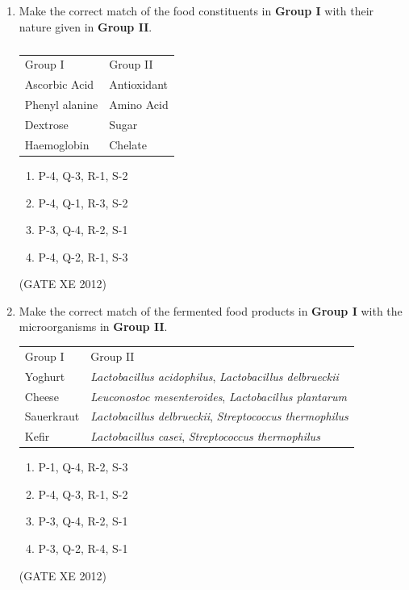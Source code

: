 \documentclass[12pt]{article}
\begin{document}
\begin{enumerate}
\item Make the correct match of the food constituents in \textbf{Group I} with their nature given in \textbf{Group II}.  

\begin{table}[H]
\centering
\caption{} \label{}
\begin{tabular}{l l}
Group I & Group II \\
Ascorbic Acid & Antioxidant \\
Phenyl alanine & Amino Acid \\
Dextrose & Sugar \\
Haemoglobin & Chelate \\
\hline
\end{tabular}
\end{table}

\begin{multicols}{2}
\begin{enumerate}
    \item P-4, Q-3, R-1, S-2  
    \item P-4, Q-1, R-3, S-2  
    \item P-3, Q-4, R-2, S-1  
    \item P-4, Q-2, R-1, S-3  
\end{enumerate}
\end{multicols}
(GATE XE 2012)

\item Make the correct match of the fermented food products in \textbf{Group I} with the microorganisms in \textbf{Group II}.  

\begin{table}[H]
\centering
\begin{tabular}{l l}
Group I & Group II \\
Yoghurt & \textit{Lactobacillus acidophilus}, \textit{Lactobacillus delbrueckii} \\
Cheese & \textit{Leuconostoc mesenteroides}, \textit{Lactobacillus plantarum} \\
Sauerkraut & \textit{Lactobacillus delbrueckii}, \textit{Streptococcus thermophilus} \\
Kefir & \textit{Lactobacillus casei}, \textit{Streptococcus thermophilus} \\
\hline
\end{tabular}
\end{table}

\begin{multicols}{2}
\begin{enumerate}
    \item P-1, Q-4, R-2, S-3  
    \item P-4, Q-3, R-1, S-2  
    \item P-3, Q-4, R-2, S-1  
    \item P-3, Q-2, R-4, S-1  
\end{enumerate}
\end{multicols}
(GATE XE 2012)


\end{enumerate}
\end{document}
